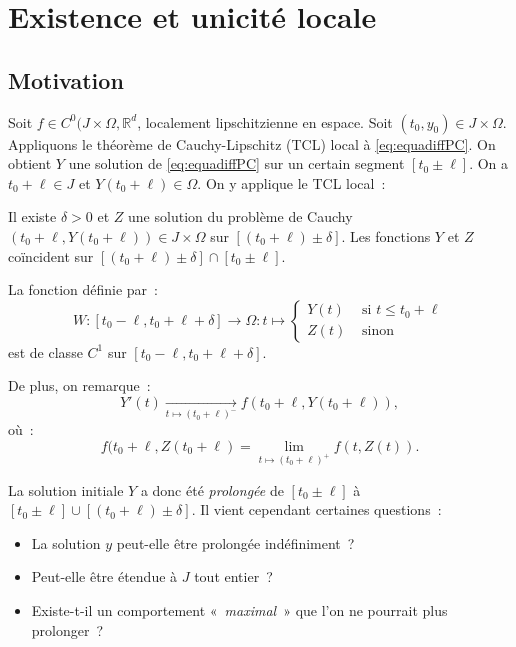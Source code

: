 \documentclass{report}
\theoremstyle{definition}
\theoremstyle{remark}
\numberwithin{equation}{section}
\newcommand{\R}{\mathbb R}
\newcommand{\Z}{\mathbb Z}
\begin{document}
	\section{Existence et unicité locale}
		\subsection{Motivation}
			Soit $f \in C^0(J \times \Omega, \R^d$, localement lipschitzienne en espace. Soit $(t_0, y_0)\in J \times \Omega$. Appliquons le théorème de
			Cauchy-Lipschitz (TCL) local à \eqref{eq:equadiffPC}. On obtient $Y$ une solution de \eqref{eq:equadiffPC} sur un certain segment $[t_0 \pm \ell]$.
			On a $t_0 + \ell \in J$ et $Y(t_0 + \ell) \in \Omega$. On y applique le TCL local~:

			Il existe $\delta > 0$ et $Z$ une solution du problème de Cauchy $(t_0+\ell, Y(t_0+\ell)) \in J \times \Omega$ sur $[(t_0+\ell) \pm \delta]$.
			Les fonctions $Y$ et $Z$ coïncident sur $[(t_0 + \ell) \pm \delta] \cap [t_0 \pm \ell]$.

			La fonction définie par~:
			\begin{equation}
				W : [t_0-\ell, t_0+\ell+\delta] \to \Omega : t \mapsto \begin{cases}Y(t) &\text{ si } t \leq t_0+\ell \\Z(t) &\text{ sinon }\end{cases}
			\end{equation}
			est de classe $C^1$ sur $[t_0-\ell, t_0+\ell+\delta]$.

			De plus, on remarque~:
			\begin{equation}
				Y'(t) \xrightarrow[t \mapsto (t_0+\ell)^-]{} f(t_0+\ell, Y(t_0+\ell)),
			\end{equation}
			où~:
			\begin{equation}
				f(t_0+\ell, Z(t_0+\ell) = \lim_{t \mapsto (t_0+\ell)^+}f(t, Z(t)).
			\end{equation}

			La solution initiale $Y$ a donc été \textit{prolongée} de $[t_0 \pm \ell]$ à $[t_0 \pm \ell] \cup [(t_0+\ell) \pm \delta]$.
			Il vient cependant certaines questions~:
			\begin{itemize}
				\item La solution $y$ peut-elle être prolongée indéfiniment~?
				\item Peut-elle être étendue à $J$ tout entier~?
				\item Existe-t-il un comportement «~\textit{maximal}~» que l'on ne pourrait plus prolonger~?
			\end{itemize}
\end{document}
